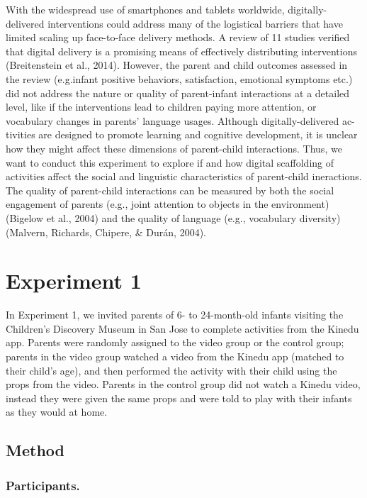 \documentclass[10pt, letterpaper]{article}
\begin{document}
With the widespread use of smartphones and tablets worldwide,
digitally-delivered interventions could address many of the logistical
barriers that have limited scaling up face-to-face delivery methods. A
review of 11 studies verified that digital delivery is a promising means
of effectively distributing interventions (Breitenstein et al., 2014).
However, the parent and child outcomes assessed in the review
(e.g.infant positive behaviors, satisfaction, emotional symptoms etc.)
did not address the nature or quality of parent-infant interactions at a
detailed level, like if the interventions lead to children paying more
attention, or vocabulary changes in parents' language usages. Although
digitally-delivered ac-tivities are designed to promote learning and
cognitive development, it is unclear how they might affect these
dimensions of parent-child interactions. Thus, we want to conduct this
experiment to explore if and how digital scaffolding of activities
affect the social and linguistic characteristics of parent-child
ineractions. The quality of parent-child interactions can be measured by
both the social engagement of parents (e.g., joint attention to objects
in the environment)(Bigelow et al., 2004) and the quality of language
(e.g., vocabulary diversity) (Malvern, Richards, Chipere, \& Durán,
2004).

\section{Experiment 1}\label{experiment-1}

In Experiment 1, we invited parents of 6- to 24-month-old infants
visiting the Children's Discovery Museum in San Jose to complete
activities from the Kinedu app. Parents were randomly assigned to the
video group or the control group; parents in the video group watched a
video from the Kinedu app (matched to their child's age), and then
performed the activity with their child using the props from the video.
Parents in the control group did not watch a Kinedu video, instead they
were given the same props and were told to play with their infants as
they would at home.

\subsection{Method}\label{method}

\subsubsection{Participants.}\label{participants.}
\end{document}
